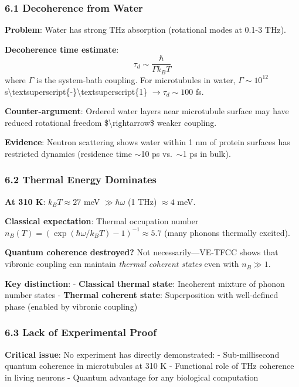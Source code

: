 \subsubsection{6.1 Decoherence from Water}\label{decoherence-from-water}

\textbf{Problem}: Water has strong THz absorption (rotational modes at
0.1-3 THz).

\textbf{Decoherence time estimate}:
\[\tau_d \sim \frac{\hbar}{\Gamma k_B T}\] where \(\Gamma\) is the
system-bath coupling. For microtubules in water, \(\Gamma \sim 10^{12}\)
s\textbackslash textsuperscript\{-\}\textbackslash textsuperscript\{1\}
\(\rightarrow \tau_d \sim 100\) fs.

\textbf{Counter-argument}: Ordered water layers near microtubule surface
may have reduced rotational freedom \$\textbackslash rightarrow\$ weaker
coupling.

\textbf{Evidence}: Neutron scattering shows water within 1 nm of protein
surfaces has restricted dynamics (residence time $\sim$10 ps
vs.~$\sim$1 ps in bulk).

\subsubsection{6.2 Thermal Energy
Dominates}\label{thermal-energy-dominates}

\textbf{At 310 K}: \(k_B T \approx 27\) meV \(\gg \hbar \omega\) (1 THz)
\(\approx 4\) meV.

\textbf{Classical expectation}: Thermal occupation number
\(n_B(T) = (\exp(\hbar \omega / k_B T) - 1)^{-1} \approx 5.7\) (many
phonons thermally excited).

\textbf{Quantum coherence destroyed?} Not necessarily---VE-TFCC
shows that vibronic coupling can maintain \emph{thermal coherent states}
even with \(n_B \gg 1\).

\textbf{Key distinction}: - \textbf{Classical thermal state}: Incoherent
mixture of phonon number states - \textbf{Thermal coherent state}:
Superposition with well-defined phase (enabled by vibronic coupling)

\subsubsection{6.3 Lack of Experimental
Proof}\label{lack-of-experimental-proof}

\textbf{Critical issue}: No experiment has directly demonstrated: -
Sub-millisecond quantum coherence in microtubules at 310 K - Functional
role of THz coherence in living neurons - Quantum advantage for any
biological computation

